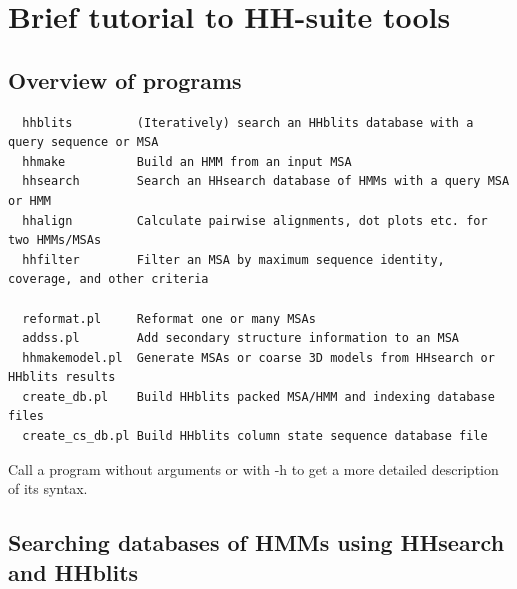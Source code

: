 \documentclass[11pt,a4paper]{article}
\begin{document}
\section{Brief tutorial to HH-suite tools}

\subsection{Overview of programs}

\small 
\begin{verbatim}
  hhblits         (Iteratively) search an HHblits database with a query sequence or MSA
  hhmake          Build an HMM from an input MSA 
  hhsearch        Search an HHsearch database of HMMs with a query MSA or HMM
  hhalign         Calculate pairwise alignments, dot plots etc. for two HMMs/MSAs
  hhfilter        Filter an MSA by maximum sequence identity, coverage, and other criteria
  
  reformat.pl     Reformat one or many MSAs
  addss.pl        Add secondary structure information to an MSA
  hhmakemodel.pl  Generate MSAs or coarse 3D models from HHsearch or HHblits results	
  create_db.pl    Build HHblits packed MSA/HMM and indexing database files
  create_cs_db.pl Build HHblits column state sequence database file 
\end{verbatim} 
\normalsize

Call a program without arguments or with -h to get a more detailed description of 
its syntax.


\subsection{Searching databases of HMMs using HHsearch and HHblits}\label{searching_hm_dbs}

\end{document}

